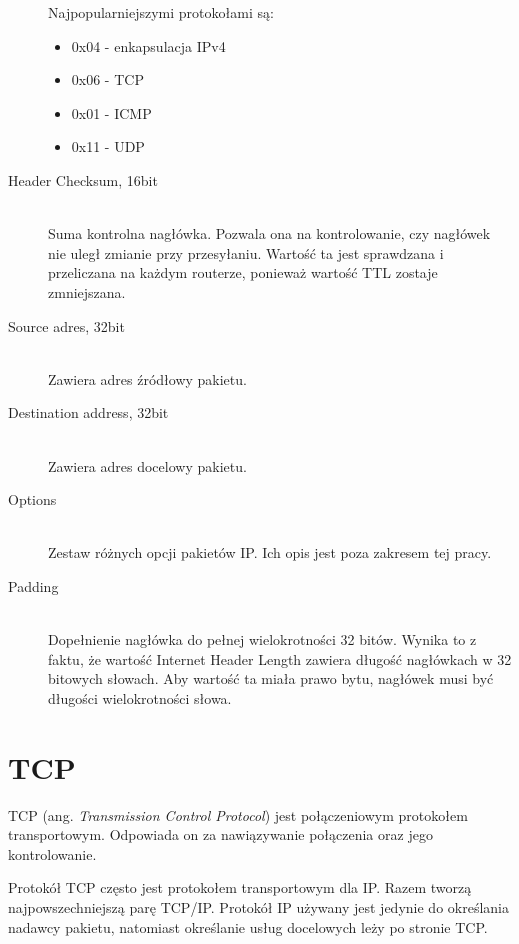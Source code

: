 \begin{description}
				Najpopularniejszymi protokołami są:
				\begin{itemize}
					\item 0x04 - enkapsulacja IPv4
					\item 0x06 - TCP
					\item 0x01 - ICMP
					\item 0x11 - UDP
				\end{itemize}
			\item[Header Checksum, 16bit]\hfill \\
				Suma kontrolna nagłówka.
				Pozwala ona na kontrolowanie, czy nagłówek nie uległ zmianie przy przesyłaniu.
				Wartość ta jest sprawdzana i przeliczana na każdym routerze, ponieważ wartość TTL zostaje zmniejszana.
			\item[Source adres, 32bit]\hfill \\
				Zawiera adres źródłowy pakietu.
			\item[Destination address, 32bit]\hfill \\
				Zawiera adres docelowy pakietu.
			\item[Options]\hfill \\
				Zestaw różnych opcji pakietów IP.
				Ich opis jest poza zakresem tej pracy.
			\item[Padding]\hfill \\
				Dopełnienie nagłówka do pełnej wielokrotności 32 bitów.
				Wynika to z faktu, że wartość Internet Header Length zawiera długość nagłówkach w 32 bitowych słowach.
				Aby wartość ta miała prawo bytu, nagłówek musi być długości wielokrotności słowa.
			\end{description}	
	\section{TCP}
			TCP (ang. \textit{Transmission Control Protocol}) jest połączeniowym protokołem transportowym.
			Odpowiada on za nawiązywanie połączenia oraz jego kontrolowanie.

			Protokół TCP często jest protokołem transportowym dla IP.
			Razem tworzą najpowszechniejszą parę TCP/IP.
			Protokół IP używany jest jedynie do określania nadawcy pakietu, natomiast określanie usług docelowych leży po stronie TCP.\\


